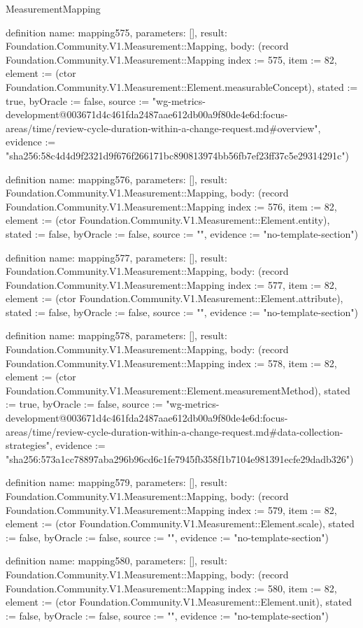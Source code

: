 \begin{lexlean}{MeasurementMapping}
\begin{semanticmodule}
definition{
  name: mapping575,
  parameters: [],
  result: Foundation.Community.V1.Measurement::Mapping,
  body: (record Foundation.Community.V1.Measurement::Mapping {index := 575, item := 82, element := (ctor Foundation.Community.V1.Measurement::Element.measurableConcept), stated := true, byOracle := false, source := "wg-metrics-development@003671d4c461fda2487aae612db00a9f80de4e6d:focus-areas/time/review-cycle-duration-within-a-change-request.md#overview", evidence := "sha256:58c4d4d9f2321d9f676f266171bc890813974bb56fb7ef23ff37c5e29314291c"})
}

definition{
  name: mapping576,
  parameters: [],
  result: Foundation.Community.V1.Measurement::Mapping,
  body: (record Foundation.Community.V1.Measurement::Mapping {index := 576, item := 82, element := (ctor Foundation.Community.V1.Measurement::Element.entity), stated := false, byOracle := false, source := "", evidence := "no-template-section"})
}

definition{
  name: mapping577,
  parameters: [],
  result: Foundation.Community.V1.Measurement::Mapping,
  body: (record Foundation.Community.V1.Measurement::Mapping {index := 577, item := 82, element := (ctor Foundation.Community.V1.Measurement::Element.attribute), stated := false, byOracle := false, source := "", evidence := "no-template-section"})
}

definition{
  name: mapping578,
  parameters: [],
  result: Foundation.Community.V1.Measurement::Mapping,
  body: (record Foundation.Community.V1.Measurement::Mapping {index := 578, item := 82, element := (ctor Foundation.Community.V1.Measurement::Element.measurementMethod), stated := true, byOracle := false, source := "wg-metrics-development@003671d4c461fda2487aae612db00a9f80de4e6d:focus-areas/time/review-cycle-duration-within-a-change-request.md#data-collection-strategies", evidence := "sha256:573a1cc78897aba296b96cd6c1fe7945fb358f1b7104e981391ecfe29dadb326"})
}

definition{
  name: mapping579,
  parameters: [],
  result: Foundation.Community.V1.Measurement::Mapping,
  body: (record Foundation.Community.V1.Measurement::Mapping {index := 579, item := 82, element := (ctor Foundation.Community.V1.Measurement::Element.scale), stated := false, byOracle := false, source := "", evidence := "no-template-section"})
}

definition{
  name: mapping580,
  parameters: [],
  result: Foundation.Community.V1.Measurement::Mapping,
  body: (record Foundation.Community.V1.Measurement::Mapping {index := 580, item := 82, element := (ctor Foundation.Community.V1.Measurement::Element.unit), stated := false, byOracle := false, source := "", evidence := "no-template-section"})
}


\end{semanticmodule}
\end{lexlean}
